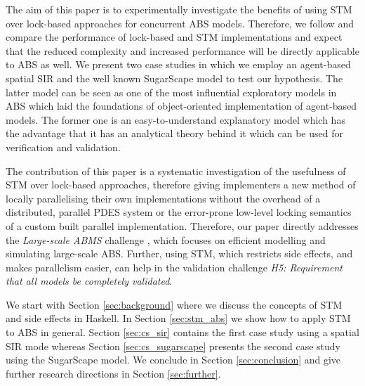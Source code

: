 \medskip

The aim of this paper is to experimentally investigate the benefits of using STM over lock-based approaches for concurrent ABS models. Therefore, we follow \cite{discolo_lock_2006} and compare the performance of lock-based and STM implementations and expect that the reduced complexity and increased performance will be directly applicable to ABS as well. We present two case studies in which we employ an agent-based spatial SIR \cite{macal_agent-based_2010, thaler_pure_2018} and the well known SugarScape \cite{epstein_growing_1996} model to test our hypothesis. The latter model can be seen as one of the most influential exploratory models in ABS which laid the foundations of object-oriented implementation of agent-based models. The former one is an easy-to-understand explanatory model which has the advantage that it has an analytical theory behind it which can be used for verification and validation. 

The contribution of this paper is a systematic investigation of the usefulness of STM over lock-based approaches, therefore giving implementers a new method of locally parallelising their own implementations without the overhead of a distributed, parallel PDES system or the error-prone low-level locking semantics of a custom built parallel implementation. Therefore, our paper directly addresses the \textit{Large-scale ABMS} challenge \cite{macal_everything_2016}, which focuses on efficient modelling and simulating large-scale ABS. Further, using STM, which restricts side effects, and makes parallelism easier, can help in the validation challenge \cite{macal_everything_2016} \emph{H5: Requirement that all models be completely validated}.

We start with Section \ref{sec:background} where we discuss the concepts of STM and side effects in Haskell. In Section \ref{sec:stm_abs} we show how to apply STM to ABS in general. Section \ref{sec:cs_sir} contains the first case study using a spatial SIR mode whereas Section \ref{sec:cs_sugarscape} presents the second case study using the SugarScape model. We conclude in Section \ref{sec:conclusion} and give further research directions in Section \ref{sec:further}.